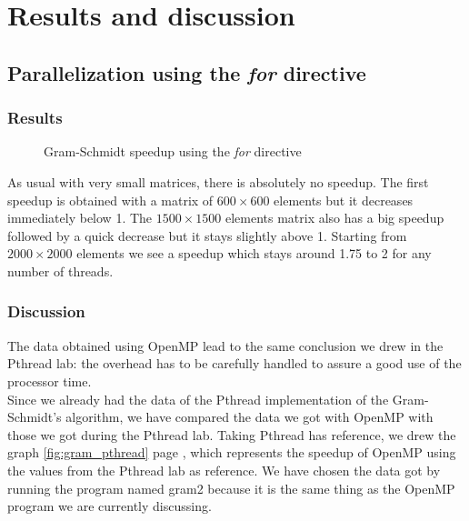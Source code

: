 \chapter{Results and discussion}

\section{Parallelization using the \textit{for} directive}

\subsection{Results}

\begin{figure}[ht]
  \begin{center}
  \end{center}
  \caption{Gram-Schmidt speedup using the \textit{for} directive}
  \label{fig:gram_speedup}
\end{figure} 

As usual with very small matrices, there is absolutely no speedup. The first speedup is obtained with a matrix of $600\times 600$ elements but it decreases immediately below 1. The $1500\times 1500$ elements matrix also has a big speedup followed by a quick decrease but it stays slightly above 1.
Starting from $2000\times 2000$ elements we see a speedup which stays around 1.75 to 2 for any number of threads.


\subsection{Discussion}

The data obtained using OpenMP lead to the same conclusion we drew in the Pthread lab: the overhead has to be carefully handled to assure a good use of the processor time.\\

Since we already had the data of the Pthread implementation of the Gram-Schmidt's algorithm, we have compared the data we got with OpenMP with those we got during the Pthread lab. Taking Pthread has reference, we drew the graph \ref{fig:gram_pthread} page \pageref{fig:gram_pthread}, which represents the speedup of OpenMP using the values from the Pthread lab as reference. We have chosen the data got by running the program named gram2 because it is the same thing as the OpenMP program we are currently discussing.

